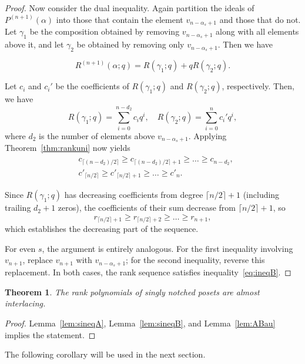 \documentclass{article}
\newtheorem{theorem}{Theorem}
\theoremstyle{remark}
\begin{document}
\begin{proof}
Now consider the dual inequality. Again partition the ideals of \( P^{(n+1)}(\alpha) \) into those that contain the element \( v_{n - \alpha_s + 1} \) and those that do not. Let \( \gamma_1 \) be the composition obtained by removing \( v_{n - \alpha_s + 1} \) along with all elements above it, and let \( \gamma_2 \) be obtained by removing only \( v_{n - \alpha_s + 1} \). Then we have


\[
R^{(n+1)}(\alpha; q) = R(\gamma_1; q) + q R(\gamma_2; q).
\]

Let \( c_i \) and \( c_i' \) be the coefficients of \( R(\gamma_1; q) \) and \( R(\gamma_2; q) \), respectively. Then, we have
\[
R(\gamma_1; q) = \sum_{i=0}^{n - d_2} c_i q^i, \quad R(\gamma_2; q) = \sum_{i=0}^{n} c_i' q^i,
\]
where \( d_2 \) is the number of elements above \( v_{n - \alpha_s + 1} \). Applying Theorem~\ref{thm:rankuni} now yields
\begin{align*}
    &c_{\lceil (n - d_2)/2 \rceil} \ge c_{\lceil (n - d_2)/2 \rceil + 1} \ge \dots \ge c_{n - d_2}, \\
&c'_{\lceil n/2 \rceil} \ge c'_{\lceil n/2 \rceil + 1} \ge \dots \ge c'_n.
\end{align*}

Since \( R(\gamma_1; q) \) has decreasing coefficients from degree \( \lceil n/2 \rceil + 1 \) (including trailing $d_{2} + 1$ zeros), the coefficients of their sum decrease from \( \lceil n/2 \rceil + 1 \), so
\[
r_{\lceil n/2 \rceil + 1} \ge r_{\lceil n/2 \rceil + 2} \ge \dots \ge r_{n+1},
\]
which establishes the decreasing part of the sequence.

For even \( s \), the argument is entirely analogous. For the first inequality involving \( v_{n+1} \), replace \( v_{n+1} \) with \( v_{n - \alpha_s + 1} \); for the second inequality, reverse this replacement. In both cases, the rank sequence satisfies inequality~\textnormal{\eqref{eq:ineqB}}.
\end{proof}

\begin{theorem}\label{thm:RPFP}
    The rank polynomials of singly notched posets are almost interlacing.
\end{theorem}
\begin{proof}
Lemma~\ref{lem:sineqA}, Lemma~\ref{lem:sineqB}, and Lemma~\ref{lem:ABau} implies the statement.
\end{proof}

The following corollary will be used in the next section.
\end{document}
